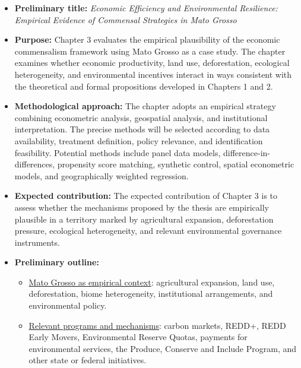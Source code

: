 \begin{itemize}

    \item \textbf{Preliminary title:} \emph{Economic Efficiency and Environmental Resilience: Empirical Evidence of Commensal Strategies in Mato Grosso}

    \item \textbf{Purpose:} Chapter 3 evaluates the empirical plausibility of the economic commensalism framework using Mato Grosso as a case study. The chapter examines whether economic productivity, land use, deforestation, ecological heterogeneity, and environmental incentives interact in ways consistent with the theoretical and formal propositions developed in Chapters 1 and 2.

    \item \textbf{Methodological approach:} The chapter adopts an empirical strategy combining econometric analysis, geospatial analysis, and institutional interpretation. The precise methods will be selected according to data availability, treatment definition, policy relevance, and identification feasibility. Potential methods include panel data models, difference-in-differences, propensity score matching, synthetic control, spatial econometric models, and geographically weighted regression.

    \item \textbf{Expected contribution:} The expected contribution of Chapter 3 is to assess whether the mechanisms proposed by the thesis are empirically plausible in a territory marked by agricultural expansion, deforestation pressure, ecological heterogeneity, and relevant environmental governance instruments.

    \item \textbf{Preliminary outline:}

    \begin{itemize}

        \item[i.] \underline{Mato Grosso as empirical context}: agricultural expansion, land use, deforestation, biome heterogeneity, institutional arrangements, and environmental policy.

        \item[ii.] \underline{Relevant programs and mechanisms}: carbon markets, REDD+, REDD Early Movers, Environmental Reserve Quotas, payments for environmental services, the Produce, Conserve and Include Program, and other state or federal initiatives.


\end{itemize}
\end{itemize}
